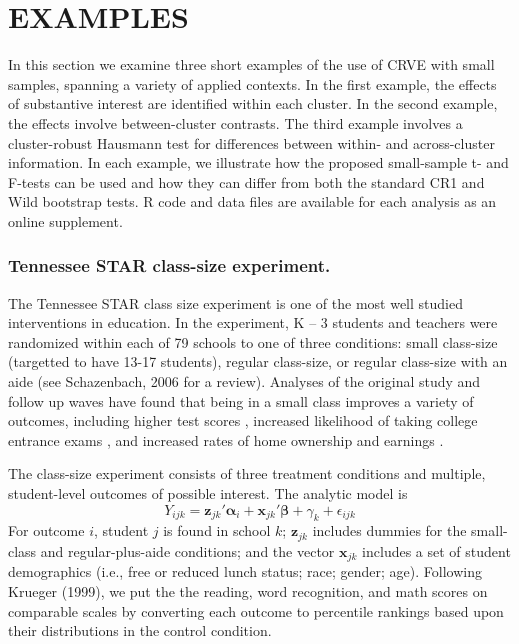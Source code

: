 \documentclass[12pt]{article}\usepackage[]{graphicx}\usepackage[]{color}
\newcommand{\bm}{\mathbf}
\newcommand{\bs}{\boldsymbol}
\begin{document}
\section{EXAMPLES}
\label{subsec:examples_F}


In this section we examine three short examples of the use of CRVE with small samples, spanning a variety of applied contexts. In the first example, the effects of substantive interest are identified within each cluster. In the second example, the effects involve between-cluster contrasts. The third example involves a cluster-robust Hausmann test for differences between within- and across-cluster information. In each example, we illustrate how the proposed small-sample t- and F-tests can be used and how they can differ from both the standard CR1 and Wild bootstrap tests. R code and data files are available for each analysis as an online supplement.

\subsubsection{Tennessee STAR class-size experiment.} 

The Tennessee STAR class size experiment is one of the most well studied interventions in education.  In the experiment, K – 3 students and teachers were randomized within each of 79 schools to one of three conditions: small class-size (targetted to have 13-17 students), regular class-size, or regular class-size with an aide (see Schazenbach, 2006 for a review). Analyses of the original study and follow up waves have found that being in a small class improves a variety of outcomes, including higher test scores \citep{Schanzenbach2006what}, increased likelihood of taking college entrance exams \citep{Krueger2001effect}, and increased rates of home ownership and earnings \citep{Chetty2011how}. 

The class-size experiment consists of three treatment conditions and multiple, student-level outcomes of possible interest. The analytic model is 
\begin{equation}
Y_{ijk} = \bm{z}_{jk}'\bs\alpha_i + \bm{x}_{jk}'\bs\beta + \gamma_k + \epsilon_{ijk}
\end{equation}
For outcome $i$, student $j$ is found in school $k$; $\bm{z}_{jk}$ includes dummies for the small-class and regular-plus-aide conditions; and the vector $\bm{x}_{jk}$ includes a set of student demographics (i.e., free or reduced lunch status; race; gender; age). Following Krueger (1999), we put the the reading, word recognition, and math scores on comparable scales by converting each outcome to percentile rankings based upon their distributions in the control condition.
\end{document}
